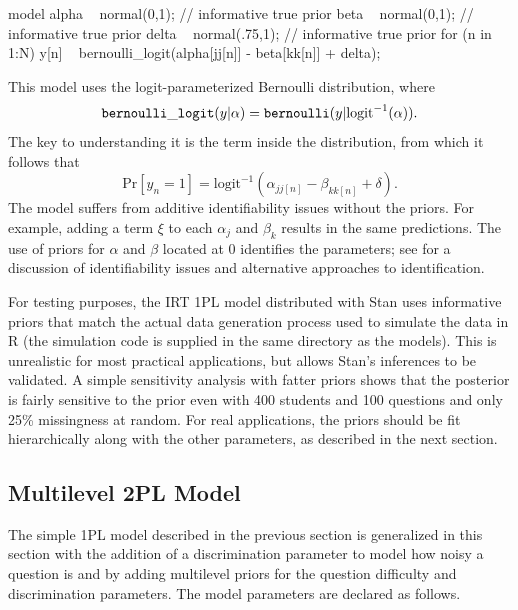 \begin{stancode}
model {
  alpha ~ normal(0,1);         // informative true prior
  beta ~ normal(0,1);          // informative true prior
  delta ~ normal(.75,1);       // informative true prior
  for (n in 1:N)
    y[n] ~ bernoulli_logit(alpha[jj[n]] - beta[kk[n]] + delta);
}
\end{stancode}
%
This model uses the logit-parameterized Bernoulli distribution, where
\[
\code{bernoulli\_logit}(y|\alpha) =
\code{bernoulli}(y|\mbox{logit}^{-1}(\alpha)).
\]
%
The key to understanding it is the term inside the
 distribution, from which it follows that
\[
\mbox{Pr}[y_n = 1] = \mbox{logit}^{-1}(\alpha_{jj[n]} - \beta_{kk[n]}
+ \delta).
\]
%
The model suffers from additive identifiability issues without the
priors.  For example, adding a term $\xi$ to each $\alpha_j$ and
$\beta_k$ results in the same predictions.  The use of priors for
$\alpha$ and $\beta$ located at 0 identifies the parameters; see
\citep{GelmanHill:2007} for a discussion of identifiability issues and
alternative approaches to identification.  

For testing purposes, the IRT 1PL model distributed with Stan uses
informative priors that match the actual data generation process used
to simulate the data in R (the simulation code is supplied in the same
directory as the models).  This is unrealistic for most practical
applications, but allows Stan's inferences to be validated.  A simple
sensitivity analysis with fatter priors shows that the posterior is
fairly sensitive to the prior even with 400 students and 100 questions
and only 25\% missingness at random.  For real applications, the
priors should be fit hierarchically along with the other parameters,
as described in the next section.


\subsection{Multilevel 2PL Model}

The simple 1PL model described in the previous section is generalized
in this section with the addition of a discrimination parameter to
model how noisy a question is and by adding multilevel priors for the
question difficulty and discrimination parameters.  The model
parameters are declared as follows.
%

